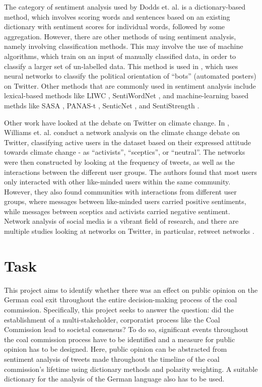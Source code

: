 \documentclass[12pt,onecolumn,twoside]{layout}
\begin{document}
The category of sentiment analysis used by Dodds et. al. is a dictionary-based method, which involves scoring words and sentences based on an existing dictionary with sentiment scores for individual words, followed by some aggregation. However, there are other methods of using sentiment analysis, namely involving classification methods. This may involve the use of machine algorithms, which train on an input of manually classified data, in order to classify a larger set of un-labelled data. This method is used in \cite{Stukal2019}, which uses neural networks to classify the political orientation of ``bots'' (automated posters) on Twitter. Other methods that are commonly used in sentiment analysis include lexical-based methods like LIWC \cite{Tausczik2009}, SentiWordNet \cite{Esuli2006}, and machine-learning based methds like SASA \cite{Wang2012}, PANAS-t \cite{Goncalves2013a}, SenticNet \cite{Cambria2010}, and SentiStrength \cite{Thelwall2017}.

Other work have looked at the debate on Twitter on climate change. In \cite{Williams2015}, Williams et. al. conduct a network analysis on the climate change debate on Twitter, classifying active users in the dataset based on their expressed attitude towards climate change - as ``activists'', ``sceptics'', or ``neutral''. The networks were then constructed by looking at the frequency of tweets, as well as the interactions between the different user groups. The authors found that most users only interacted with other like-minded users within the same community. However, they also found communities with interactions from different user groups, where messages between like-minded users carried positive sentiments, while messages between sceptics and activists carried negative sentiment. Network analysis of social media is a vibrant field of research, and there are multiple studies looking at networks on Twitter, in particular, retweet networks \cite{Cherepnalkoski2016, Stewart2018}. 

\section{Task} \label{sec:task}
This project aims to identify whether there was an effect on public opinion on the German coal exit throughout the entire decision-making process of the coal commission. Specifically, this project seeks to answer the question: did the establishment of a multi-stakeholder, corporatist process like the Coal Commission lead to societal consensus? To do so, significant events throughout the coal commission process have to be identified and a measure for public opinion has to be designed. Here, public opinion can be abstracted from sentiment analysis of tweets made throughout the timeline of the coal commission's lifetime using dictionary methods and polarity weighting. A suitable dictionary for the analysis of the German language also has to be used. 
\end{document}

